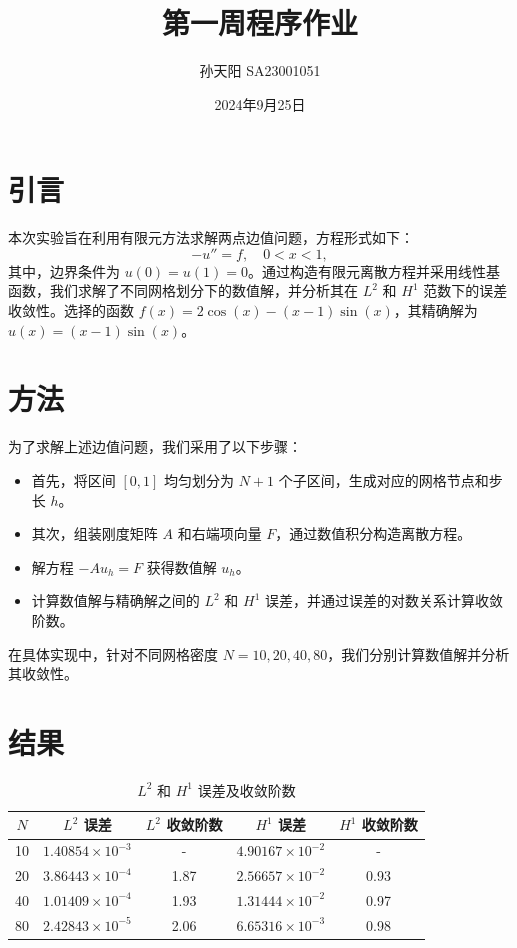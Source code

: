 \documentclass{article}
\title{第一周程序作业}
\author{孙天阳 SA23001051}
\date{2024年9月25日}
\begin{document}
\maketitle

\section{引言}
本次实验旨在利用有限元方法求解两点边值问题，方程形式如下：
\[
-u'' = f, \quad 0 < x < 1,
\]
其中，边界条件为 \( u(0) = u(1) = 0 \)。通过构造有限元离散方程并采用线性基函数，我们求解了不同网格划分下的数值解，并分析其在 \( L^2 \) 和 \( H^1 \) 范数下的误差收敛性。选择的函数 \( f(x) = 2 \cos(x) - (x-1) \sin(x) \)，其精确解为 \( u(x) = (x - 1) \sin(x) \)。

\section{方法}
为了求解上述边值问题，我们采用了以下步骤：
\begin{itemize}
    \item 首先，将区间 \( [0, 1] \) 均匀划分为 \( N+1 \) 个子区间，生成对应的网格节点和步长 \( h \)。
    \item 其次，组装刚度矩阵 \( A \) 和右端项向量 \( F \)，通过数值积分构造离散方程。
    \item 解方程 \( -A u_h = F \) 获得数值解 \( u_h \)。
    \item 计算数值解与精确解之间的 \( L^2 \) 和 \( H^1 \) 误差，并通过误差的对数关系计算收敛阶数。
\end{itemize}
在具体实现中，针对不同网格密度 \( N = 10, 20, 40, 80 \)，我们分别计算数值解并分析其收敛性。

\section{结果}
\begin{table}[h!]
    \centering
    \caption{\( L^2 \) 和 \( H^1 \) 误差及收敛阶数}
    \label{tab:results}
    \begin{tabular}{ccccc}
        \toprule
        \( N \) & \( L^2 \) 误差 & \( L^2 \) 收敛阶数 & \( H^1 \) 误差 & \( H^1 \) 收敛阶数 \\
        \midrule
        10  & \( 1.40854 \times 10^{-3} \) & -    & \( 4.90167 \times 10^{-2} \) & - \\
        20  & \( 3.86443 \times 10^{-4} \) & 1.87 & \( 2.56657 \times 10^{-2} \) & 0.93 \\
        40  & \( 1.01409 \times 10^{-4} \) & 1.93 & \( 1.31444 \times 10^{-2} \) & 0.97 \\
        80  & \( 2.42843 \times 10^{-5} \) & 2.06 & \( 6.65316 \times 10^{-3} \) & 0.98 \\
        \bottomrule
    \end{tabular}
\end{table}
\end{document}
